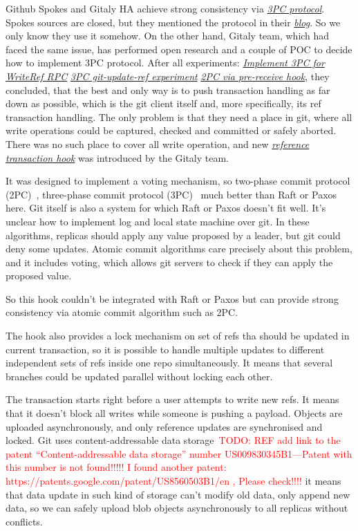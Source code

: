 \documentclass[acmlarge, screen, nonacm, 11pt]{acmart}
\newcommand{\todo}[1]{\textcolor{red}{TODO: #1}}
\begin{document}
\begin{itemize}
Github Spokes and Gitaly HA achieve strong consistency via \emph{\href{https://en.wikipedia.org/wiki/Three-phase_commit_protocol}{3PC protocol}}.
Spokes sources are closed, but they mentioned the protocol in their \emph{\href{https://github.blog/2017-10-13-stretching-spokes/\#reducing-round-trips}{blog}}.
So we only know they use it somehow.
On the other hand, Gitaly team, which had faced the same issue, has performed open research and a couple of POC to decide how to implement 3PC protocol.
After all experiments:
\emph{\href{https://gitlab.com/gitlab-org/gitaly/-/issues/2466}{Implement 3PC for WriteRef RPC}}
\emph{\href{https://gitlab.com/gitlab-org/gitaly/-/issues/2529}{3PC git-update-ref experiment}}
\emph{\href{https://gitlab.com/gitlab-org/gitaly/-/issues/2635}{2PC via pre-receive hook}},
  they concluded, that the best and only way is to push transaction handling as far down as possible, which is the git client itself and, more specifically, its ref transaction handling.
The only problem is that they need a place in git, where all write operations could be captured, checked and committed or safely aborted.
There was no such place to cover all write operation, and new
\emph{\href{https://github.com/git/git/commit/675415976704459edaf8fb39a176be2be0f403d8}{reference transaction hook}}
was introduced by the Gitaly team.

It was designed to implement a voting mechanism,
so two-phase commit protocol (2PC)~\cite{two-phase_commit_protocol},
three-phase commit protocol (3PC)~\cite{three-phase_commit_protocol}
much better than Raft or Paxos here.
Git itself is also a system for which Raft or Paxos doesn't fit well.
It's unclear how to implement log and local state machine over git.
In these algorithms, replicas should apply any value proposed by a leader, but git could deny some updates.
Atomic commit algorithms care precisely about this problem, and it includes voting, which allows git servers to check if they can apply the proposed value.

So this hook couldn't be integrated with Raft or Paxos but can provide strong consistency via
atomic commit algorithm such as 2PC\@.

The hook also provides a lock mechanism on set of refs tha should be updated in current transaction,
so it is possible to handle multiple updates to different independent sets of refs inside one repo simultaneously.
It means that several branches could be updated parallel without locking each other.

The transaction starts right before a user attempts to write new refs.
It means that it doesn't block all writes while someone is pushing a payload.
Objects are uploaded asynchronously, and only reference updates are synchronised and
locked. Git uses content-addressable
data storage~\todo{REF add link to the patent ``Content-addressable data storage'' number US009830345B1---Patent with this number is not found!!!!! I found another patent: https://patents.google.com/patent/US8560503B1/en , Please check!!!!}
it means that data update in such kind of storage can't modify old data, only append new data, so we can safely
upload blob objects asynchronously to all replicas without conflicts.


\end{itemize}
\end{document}
